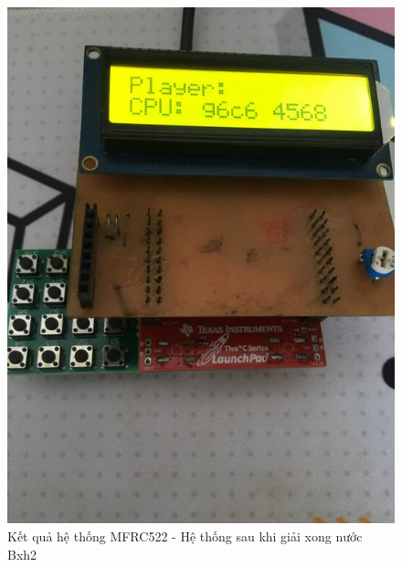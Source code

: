 \begin{figure}[ht]
\centering
\includegraphics[scale=0.4]{images/chess_end.jpg}
\caption{Kết quả hệ thống MFRC522 - Hệ thống sau khi giải xong nước Bxh2}
\label{fig:chess_end}
\end{figure}

